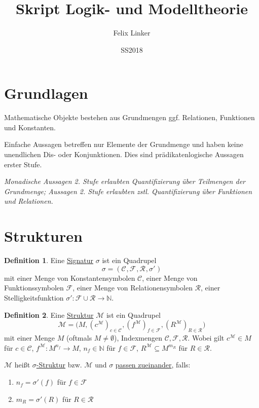 \documentclass{article}
\title{Skript Logik- und Modelltheorie}
\author{Felix Linker}
\date{SS2018}
\theoremstyle{definition}
\newtheorem{dfn}{Definition}
\newcommand{\calC}{\mathcal{C}}
\newcommand{\calF}{\mathcal{F}}
\newcommand{\calM}{\mathcal{M}}
\newcommand{\calR}{\mathcal{R}}
\newcommand{\sign}[1]{(\calC_{#1}, \calF_{#1}, \calR_{#1}, \sigma'_{#1})}
\newcommand{\struc}[3]{\big(#1, (c^{#2})_{c \in \calC_{#3}}, (f^{#2})_{f \in \calF_{#3}}, (R^{#2})_{R \in \calR_{#3}}\big)}
\begin{document}
    \maketitle

    \section*{Grundlagen}

    Mathematische Objekte bestehen aus Grundmengen ggf. Relationen, Funktionen und Konstanten.

    Einfache Aussagen betreffen nur Elemente der Grundmenge und haben keine unendlichen Dis- oder Konjunktionen.
    Dies sind prädikatenlogische Aussagen erster Stufe.

    \textit{Monadische Aussagen 2. Stufe erlaubten Quantifizierung über Teilmengen der Grundmenge; Aussagen 2. Stufe erlaubten zstl. Quantifizierung über Funktionen und Relationen.}

    \section{Strukturen}

    \begin{dfn}
        Eine \underline{Signatur} $ \sigma $ ist ein Quadrupel
        \begin{equation}
            \sigma = \sign{}
        \end{equation}
        mit einer Menge von Konstantensymbolen $ \calC $, einer Menge von Funktionssymbolen $ \calF $, einer Menge von Relationensymbolen $ \calR $, einer Stelligkeitsfunktion $ \sigma' : \calF \cup \calR \rightarrow \mathbb{N} $.
    \end{dfn}

    \begin{dfn}
        Eine \underline{Struktur} $ \calM $ ist ein Quadrupel
        \begin{equation}
            \calM = \struc{M}{\calM}{}
        \end{equation}
        mit einer Menge $ M $ (oftmals $ M \neq \emptyset $), Indexmengen $ \calC, \calF, \calR $.
        Wobei gilt $ c^\calM \in M $ für $ c \in \calC $, $ f^\calM : M^{n_f} \rightarrow M $, $ n_f \in \mathbb{N} $ für $ f \in \calF $, $ R^\calM \subseteq M^{m_R} $ für $ R \in \calR $.
    \end{dfn}

    $ \calM $ heißt \underline{$ \sigma $-Struktur} bzw. $ \calM $ und $ \sigma $ \underline{passen zueinander}, falls:
    \begin{enumerate}
        \item $ n_f = \sigma'(f) $ für $ f \in \calF $
        \item $ m_R = \sigma'(R) $ für $ R \in \calR $
    \end{enumerate}
\end{document}
